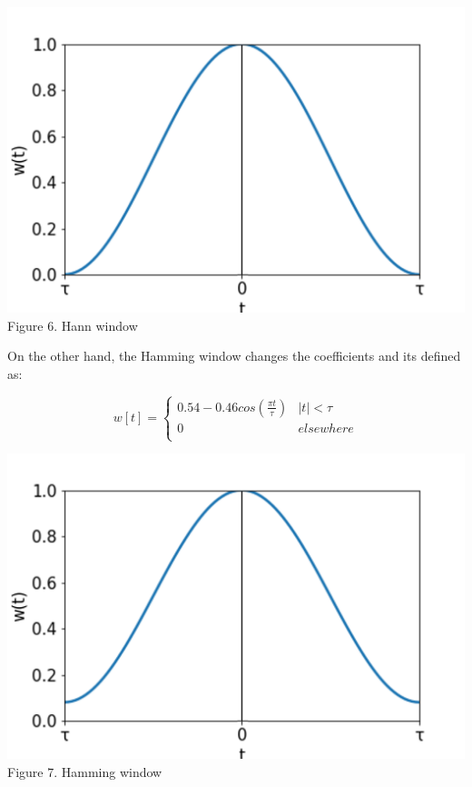 {{{{{\begin{itemize}
       \begin{center}
         \includegraphics[scale = 0.4]{images/hann.png} \\
         Figure 6. Hann window
         \end{center}


    On the other hand, the Hamming window changes the coefficients and its defined as:

    \begin{equation*}
          w[t]=
        \begin{cases}
          0.54 - 0.46cos(\frac{\pi t}{\tau})  &|t| < \tau \\
          0  &elsewhere \\
        \end{cases}
      \end{equation*}

      \begin{center}
         \includegraphics[scale = 0.4]{images/hamming.png} \\
         Figure 7. Hamming window
         \end{center}


\end{itemize}}}}}}

